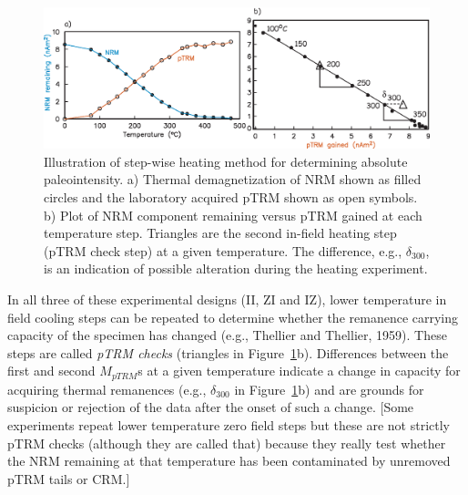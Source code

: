 \begin{figure}[htb]
\centering  \includegraphics[width= 14 cm]{EPSfiles/TT.eps}
\caption{Illustration of step-wise heating method for determining absolute paleointensity.  a) Thermal demagnetization of NRM shown as filled circles and the laboratory acquired pTRM shown as open symbols.  b) Plot of NRM component remaining versus pTRM gained at each temperature step.  Triangles are the second in-field heating step (pTRM check step) at  a given temperature.  The difference, e.g., $\delta_{300}$, is an indication of possible alteration during the heating experiment. }
\label{fig:thellier}
\end{figure}


In all three of these experimental designs  (II, ZI and IZ),  lower temperature in field cooling steps can be repeated to determine whether the remanence carrying capacity of the specimen has changed (e.g., Thellier and Thellier, 1959). \nocite{thellier59}    These steps are called  
{\it pTRM checks}  (triangles in Figure~\ref{fig:thellier}b).   Differences between the first and second  $M_{ pTRM}$s at a given temperature indicate a change in capacity for acquiring thermal remanences (e.g., $\delta_{300}$ in Figure~\ref{fig:thellier}b)  and are grounds for suspicion or rejection of the data after the onset of such a change.  
 [Some experiments repeat lower temperature zero field steps but these are not strictly pTRM checks (although they are called that) because they really test whether the NRM remaining at that temperature has been contaminated by unremoved pTRM tails or CRM.]



